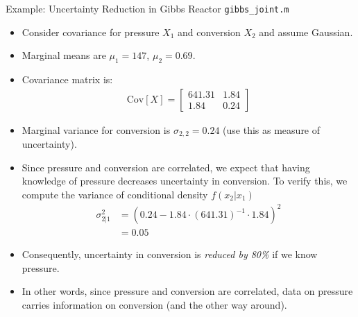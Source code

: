 \documentclass[handout,9pt]{beamer}
\begin{document}
%
\begin{frame}{Example: Uncertainty Reduction in Gibbs Reactor \footnotesize{\texttt{gibbs\_joint.m}}}

\begin{itemize}
\setlength{\itemsep}{5pt}
\item Consider covariance for pressure $X_1$ and conversion $X_2$ and assume Gaussian.
\item Marginal means are $\mu_1=147$, $\mu_2=0.69$.
\item Covariance matrix is:
\begin{align*}
\textrm{Cov}[X]=\left[\begin{array}{cc}  641.31    &      1.84\\
          1.84     &     0.24\end{array}\right]
\end{align*}
\item Marginal variance for conversion is $\sigma_{2,2}=0.24$ (use this as measure of uncertainty).

\item Since pressure and conversion are correlated, we expect that having knowledge of pressure decreases uncertainty in  conversion. To verify this, we compute the variance of conditional density $f(x_2|x_1)$
\begin{align*}
\sigma_{2|1}^2&=(0.24-1.84\cdot (641.31)^{-1}\cdot 1.84)^2\\
&=0.05
\end{align*}
\item Consequently, uncertainty in conversion is {\em reduced by 80\%} if we know pressure.  
\item In other words,  since pressure and conversion are correlated, data on pressure carries information on conversion (and the other way around). 

\end{itemize}

\end{frame}
\end{document}
